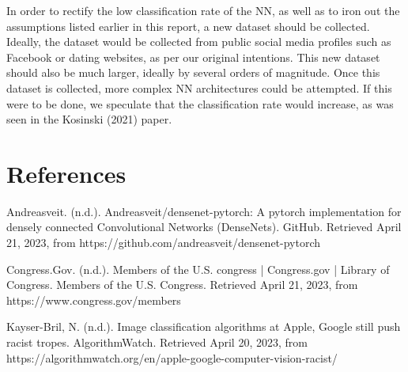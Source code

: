 \documentclass[manuscript,screen,review]{acmart}
\begin{document}
In order to rectify the low classification rate of the NN, as well as to iron out the assumptions listed earlier in this report, a new dataset should be collected. Ideally, the dataset would be collected from public social media profiles such as Facebook or dating websites, as per our original intentions. This new dataset should also be much larger, ideally by several orders of magnitude. Once this dataset is collected, more complex NN architectures could be attempted. If this were to be done, we speculate that the classification rate would increase, as was seen in the Kosinski (2021) paper.


\section{References}

Andreasveit. (n.d.). Andreasveit/densenet-pytorch: A pytorch implementation for densely connected Convolutional Networks (DenseNets). GitHub. Retrieved April 21, 2023, from https://github.com/andreasveit/densenet-pytorch 

Congress.Gov. (n.d.). Members of the U.S. congress | Congress.gov | Library of Congress. Members of the U.S. Congress. Retrieved April 21, 2023, from https://www.congress.gov/members 

Kayser-Bril, N. (n.d.). Image classification algorithms at Apple, Google still push racist tropes. AlgorithmWatch. Retrieved April 20, 2023, from https://algorithmwatch.org/en/apple-google-computer-vision-racist/ 
\end{document}
